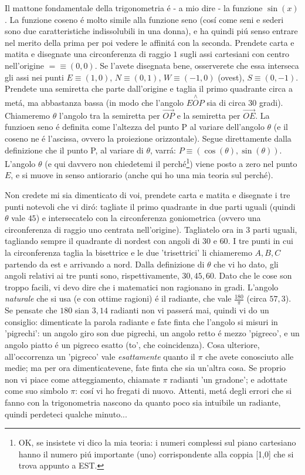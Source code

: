 Il mattone fondamentale della trigonometria \'e - a mio dire - la funzione $\sin(x)$. La funzione coseno \'e molto simile alla funzione
seno (cos\'i come seni e sederi sono due caratteristiche indissolubili in una donna), e ha quindi pi\'u senso entrare nel merito della
prima per poi vedere le affinit\'a con la seconda. Prendete carta e matita e disegnate una circonferenza di raggio $1$ sugli assi cartesiani
con centro nell'origine $= \equiv (0,0)$. Se l'avete disegnata bene, osserverete che essa interseca gli assi nei punti 
$E \equiv (1,0)$, $N \equiv (0,1)$, $W \equiv (-1,0)$ (ovest), $S \equiv (0,-1)$. 
Prendete una semiretta che parte dall'origine e taglia il primo quadrante circa a met\'a, ma abbastanza bassa (in modo che l'angolo $E\stackrel{\wedge}{O}P$ sia di circa 30 gradi). 
Chiameremo $\theta$ l'angolo tra la semiretta per $\overrightarrow{OP}$ e la semiretta per $\overrightarrow{OE}$. La funzioen seno \'e definita
come l'altezza del punto P al variare dell'angolo $\theta$ (e il coseno ne \'e l'ascissa, ovvero la proiezione orizzontale).
Segue direttamente dalla definizione che il punto P, al variare di $\theta$, varr\'a: $P \equiv (\cos(\theta),\sin(\theta))$.
L'angolo $\theta$ (e qui davvero non chiedetemi il perch\'e\footnote{OK, se insistete vi dico la mia teoria: i numeri complessi
	sul piano cartesiano hanno il numero pi\'u importante (uno) corrispondente alla coppia [1,0] che si trova appunto a EST.})
viene posto a zero nel punto $E$, e si muove in senso antiorario (anche qui ho una mia teoria sul perch\'e).

Non credete mi sia dimenticato di voi, prendete carta e matita e disegnate i tre punti notevoli che vi dir\'o: tagliate il primo quadrante
in due parti uguali (quindi $\theta$ vale $45$) e intersecatelo con la circonferenza goniometrica (ovvero una circonferenza di raggio uno centrata nell'origine).
Tagliatelo ora in 3 parti uguali, tagliando sempre il quadrante di nordest con angoli di $30$ e $60$. I tre punti in cui la circonferenza taglia la bisettrice
e le due 'trisettrici' li chiameremo $A,B,C$ partendo da est e arrivando a nord. Dalla definizione di $\theta$ che vi ho dato, gli angoli relativi ai tre punti
sono, rispettivamente, $30,45,60$. Dato che le cose son troppo facili, vi devo dire che i matematici non ragionano in gradi. L'angolo {\em naturale} che
si usa (e con ottime ragioni) \'e il radiante, che vale $\frac{180}{\pi}$ (circa $57,3$). Se pensate che $180$ sian $3,14$ radianti non vi passer\'a mai,
quindi vi do un consiglio: dimenticate la parola radiante e fate finta che l'angolo si misuri in 'pigrechi': un angolo giro son due pigrechi, un angolo retto
\'e mezzo 'pigreco', e un angolo piatto \'e un pigreco esatto (to', che coincidenza). Cosa ulteriore, all'occorrenza un 'pigreco' vale {\em esattamente}
quanto il $\pi$ che avete conosciuto alle medie; ma per ora dimenticatevene, fate finta che sia un'altra cosa. Se proprio non vi piace come atteggiamento,
chiamate $\pi$ radianti 'un gradone'; e adottate come suo simbolo $\pi$: cos\'i vi ho fregati di nuovo. Attenti, met\'a degli errori che si fanno con
la trigonometria nascono da quanto poco sia intuibile un radiante, quindi perdeteci qualche minuto...

